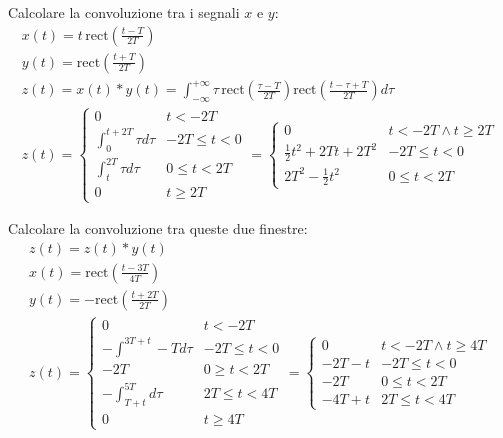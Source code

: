 \documentclass{article}
\numberwithin{equation}{subsection}
\begin{document}
Calcolare la convoluzione tra i segnali $x$ e $y$:
\begin{gather*}
    x(t)=\displaystyle t\,\mbox{rect}\left(\frac{t-T}{2T}\right)\\
    y(t)=\displaystyle\mbox{rect}\left(\frac{t+T}{2T}\right)\\
    z(t)=x(t)*y(t)=\displaystyle\int_{-\infty}^{+\infty}\tau\,\mbox{rect}\left(\frac{\tau-T}{2T}\right)\mbox{rect}\left(\frac{t-\tau+T}{2T}\right)d\tau\\
    z(t)=\begin{cases}
        0&t<-2T\\
        \displaystyle\int_{0}^{t+2T}\tau d\tau&-2T\leq t<0\\
        \displaystyle\int_{t}^{2T}\tau d\tau&0\leq t<2T\\
        0&t\geq2T
    \end{cases}=\begin{cases}
        0&t<-2T\land t\geq2T\\
        \displaystyle\frac{1}{2}t^2+2Tt+2T^2&-2T\leq t<0\\
        \displaystyle2T^2-\frac{1}{2}t^2&0\leq t<2T
    \end{cases}
\end{gather*}


Calcolare la convoluzione tra queste due finestre:
\begin{gather*}
    z(t)=z(t)*y(t)\\
    x(t)=\displaystyle\mbox{rect}\left(\frac{t-3T}{4T}\right)\\
    y(t)=-\displaystyle\mbox{rect}\left(\frac{t+2T}{2T}\right)\\
    z(t)=\begin{cases}
        0&t<-2T\\
        -\displaystyle\int^{3T+t}-{T}d\tau&-2T\leq t<0\\
        -2T&0\geq t<2T\\
        -\displaystyle\int_{T+t}^{5T}d\tau&2T\leq t<4T\\
        0&t\geq 4T
    \end{cases}=\begin{cases}
        0&t<-2T \land t\geq 4T\\
        -2T-t&-2T\leq t<0\\
        -2T&0\leq t<2T\\
        -4T+t&2T\leq t<4T
    \end{cases}
\end{gather*}
\end{document}
